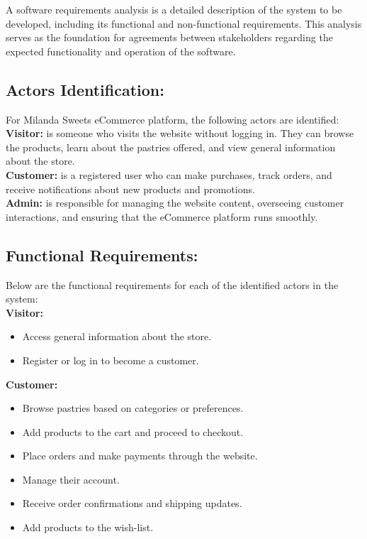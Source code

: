 A software requirements analysis is a detailed description of the system to be developed, including its functional and non-functional requirements. This analysis serves as the foundation for agreements between stakeholders regarding the expected functionality and operation of the software.

\subsection{Actors Identification:}

For Milanda Sweets eCommerce platform, the following actors are identified:\\

\textbf{Visitor:}  is someone who visits the website without logging in. They can browse the products, learn about the pastries offered, and view general information about the store.\\

\textbf{Customer:}  is a registered user who can make purchases, track orders, and receive notifications about new products and promotions.\\                      

\textbf{Admin:}  is responsible for managing the website content, overseeing customer interactions, and ensuring that the eCommerce platform runs smoothly.\\

\subsection{Functional Requirements:}

Below are the functional requirements for each of the identified actors in the system:\\

\textbf{Visitor:}\\

\begin{itemize}[label=\textbullet]
    \item Access general information about the store.
    \item Register or log in to become a customer.\\
\end{itemize}
        
\textbf{Customer:}\\

\begin{itemize}[label=\textbullet]
    \item Browse pastries based on categories or preferences.
    \item Add products to the cart and proceed to checkout.
    \item Place orders and make payments through the website.
    \item Manage their account.
    \item Receive order confirmations and shipping updates.
    \item Add products to the wish-list.\\
\end{itemize}

